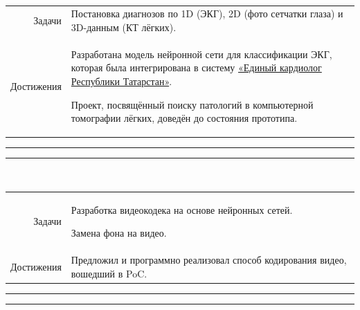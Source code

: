 \documentclass[11pt]{article}
\begin{document}
		\\
		\begin{tabular} {r | p{}}
			Задачи & Постановка диагнозов по 1D (ЭКГ), 2D (фото сетчатки глаза) и 3D-данным (КТ лёгких). \\
			Достижения &
			\begin{tabitemize}
				\item Разработана модель нейронной сети для классификации ЭКГ, которая была интегрирована в систему \href{https://va1235.wixsite.com/tis-tat/edinyj-kardiolog-respubliki-tatarst}{«Единый кардиолог Республики Татарстан»}.
				\item Проект, посвящённый поиску патологий в компьютерной томографии лёгких, доведён до состояния прототипа.
			\end{tabitemize}
		\end{tabular}%
		\vspace{0.3em}\hrule\vspace{0.1em}\hrule\vspace{0.5em}
		
		\\
		\begin{tabular} {r | p{}}
			Задачи &
			\begin{tabitemize}
				\item Разработка видеокодека на основе нейронных сетей.
				\item Замена фона на видео.
			\end{tabitemize}
			\\
			Достижения &
			Предложил и программно реализовал способ кодирования видео, вошедший в PoC.
		\end{tabular}%
		\vspace{0.3em}\hrule\vspace{0.1em}\hrule\vspace{0.5em}
		
\end{document}
